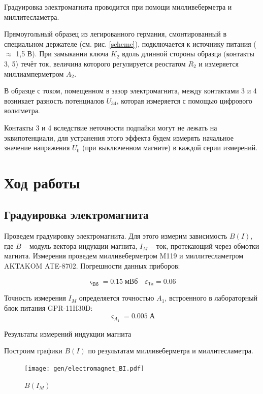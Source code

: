 \documentclass[12pt,a4paper]{article}
\newcommand{\figref}[1]{(см. рис. \ref{#1})}
\begin{document}
	Градуировка электромагнита проводится при помощи милливеберметра и миллитесламетра.
	
	Прямоугольный образец из легированного германия, смонтирован­ный в специальном держателе \figref{scheme}, подключается к источнику пита­ния ($\approx$ 1,5 В). При замыкании ключа $K_2$ вдоль длинной стороны образца (контакты 3, 5) течёт ток, величина которого регулируется реостатом $R_2$ и измеряется миллиамперметром $A_2$.
	
	В образце с током, помещенном в зазор электромагнита, между контактами 3 и 4 возникает разность потенциалов $U_{34}$, которая измеряется с помощью цифрового вольтметра.
	
	Контакты 3 и 4 вследствие неточности подпайки могут не лежать на эквипотенциали, для устранения этого эффекта будем измерять начальное значение напряжения $U_0$ (при выключенном магните) в каждой серии измерений.

	\section*{Ход работы}
	
	\subsection*{Градуировка электромагнита}
	
	Проведем градуировку электромагнита. Для этого измерим зависимость $B(I)$, где $B$ -- модуль вектора индукции магнита, $I_M$ -- ток, протекающий через обмотки магнита. Измерения проведем милливеберметром M119 и миллитесламетром AKTAKOM ATE-8702. Погрешности данных приборов:
	
	$$ \varsigma_{\text{Вб}} = 0.15 \; \text{мВб} \quad \varepsilon_{\text{Тл}} = 0.06 $$
	
	Точность измерения $I_M$ определяется точностью $A_1$, встроенного в лабораторный блок питания GPR-11H30D: $$\varsigma_{A_1} = 0.005 \; \text{А}$$
	
	\begin{table}[H]
		
		\caption{Результаты измерений индукции магнита}
	\end{table}

	Построим графики $B(I)$ по результатам милливеберметра и миллитесламетра.
	
	\begin{figure}[H]
		\texttt{[image: gen/electromagnet\_BI.pdf]}
		\caption{$B(I_M)$}
	\end{figure}
	
\end{document}
